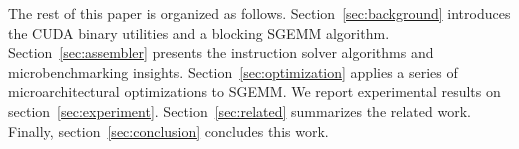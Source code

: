 The rest of this paper is organized as follows. Section~\ref{sec:background} introduces the CUDA binary utilities and a 
blocking SGEMM algorithm. Section~\ref{sec:assembler} presents the instruction solver algorithms and microbenchmarking 
insights. Section~\ref{sec:optimization} applies a series of microarchitectural optimizations to SGEMM. We report 
experimental results on section~\ref{sec:experiment}. Section~\ref{sec:related} summarizes the related work. Finally, 
section~\ref{sec:conclusion} concludes this work. 
